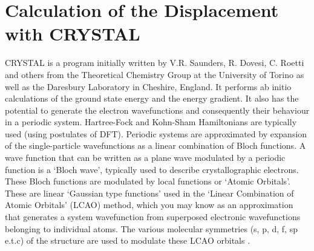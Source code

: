 \documentclass[10pt]{article}
\begin{document}




\section{Calculation of the Displacement with CRYSTAL}
CRYSTAL is a program initially written by V.R. Saunders, R. Dovesi, C. Roetti and others from the Theoretical Chemistry Group at the University of Torino as well as the Daresbury Laboratory in Cheshire, England. It performs ab initio calculations of the ground state energy and the energy gradient. It also has the potential to generate the electron wavefunctions and consequently their behaviour in a periodic system. Hartree-Fock and Kohn-Sham Hamiltonians are typically used (using postulates of DFT). Periodic systems are approximated by expansion of the single-particle wavefunctions as a linear combination of Bloch functions. A wave function that can be written as a plane wave modulated by a periodic function is a `Bloch wave', typically used to describe crystallographic electrons. These Bloch functions are modulated by local functions or `Atomic Orbitals'. These are linear `Gaussian type functions' used in the `Linear Combination of Atomic Orbitals' (LCAO) method, which you may know as an approximation that generates a system wavefunction from superposed electronic wavefunctions belonging to individual atoms. The various molecular symmetries (s, p, d, f, sp e.t.c) of the structure are used to modulate these LCAO orbitals \cite{dovesi2017crystal17}.
\end{document}
